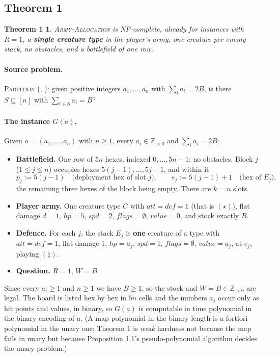 \documentclass[11pt,a4paper]{article}
\theoremstyle{plain}
\newtheorem*{thmone}{Theorem 1}
\theoremstyle{definition}
\theoremstyle{plain}
\theoremstyle{definition}
\theoremstyle{remark}
\newcommand{\ALLOC}{\textsc{Army-Allocation}}
\newcommand{\PARTITION}{\textsc{Partition}}
\begin{document}
\subsection*{Theorem 1}

\begin{thmone}
\ALLOC{} is NP-complete, already for instances with $R=1$, a \textbf{single creature type} in
the player's army, one creature per enemy stack, no obstacles, and a battlefield of one row.
\end{thmone}

\paragraph{Source problem.} \PARTITION{} (\cite[SP12]{GJ79}, \cite{Kar72}): given positive
integers $a_1,\dots,a_n$ with $\sum_i a_i=2B$, is there $S\subseteq[n]$ with
$\sum_{i\in S}a_i=B$?

\paragraph{The instance $G(a)$.} Given $a=(a_1,\dots,a_n)$ with $n\ge 1$, every
$a_i\in\mathbb{Z}_{>0}$ and $\sum_i a_i=2B$:

\begin{itemize}
\item \textbf{Battlefield.} One row of $5n$ hexes, indexed $0,\dots,5n-1$; no obstacles.
  Block $j$ ($1\le j\le n$) occupies hexes $5(j-1),\dots,5j-1$, and within it
  \[
    p_j:=5(j-1)\quad\text{(deployment hex of slot $j$)},\qquad
    e_j:=5(j-1)+1\quad\text{(hex of $E_j$)} ,
  \]
  the remaining three hexes of the block being empty. There are $k=n$ slots.
\item \textbf{Player army.} One creature type $C$ with $\mathit{att}=\mathit{def}=1$
  (that is $(\star)$), flat damage $d=1$, $\mathit{hp}=5$, $\mathit{spd}=2$,
  $\mathit{flags}=\emptyset$, $\mathit{value}=0$, and stock exactly $B$.
\item \textbf{Defence.} For each $j$, the stack $E_j$ is \textbf{one} creature of a type
  with $\mathit{att}=\mathit{def}=1$, flat damage 1, $\mathit{hp}=a_j$, $\mathit{spd}=1$,
  $\mathit{flags}=\emptyset$, $\mathit{value}=a_j$, at $e_j$, playing $(\ddagger)$.
\item \textbf{Question.} $R=1$, $W=B$.
\end{itemize}

\noindent Since every $a_i\ge 1$ and $n\ge 1$ we have $B\ge 1$, so the stock and
$W=B\in\mathbb{Z}_{>0}$ are legal. The board is listed hex by hex in $5n$ cells and the
numbers $a_j$ occur only as hit points and values, in binary, so $G(a)$ is computable in
time polynomial in the binary encoding of $a$. (A map polynomial in the binary length is
a fortiori polynomial in the unary one; Theorem 1 is \emph{weak} hardness not because the
map fails in unary but because Proposition 1.1's pseudo-polynomial algorithm decides the
unary problem.)
\end{document}
